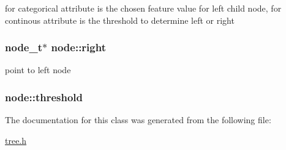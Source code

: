 for categorical attribute is the chosen feature value for left child node, for continous attribute is the threshold to determine left or right \hypertarget{classnode_a8ab67b704953f3699d566a1a5d6047ad}{
\subsubsection[{right}]{\setlength{\rightskip}{0pt plus 5cm}node\+\_\+t$\ast$ node\+::right\hspace{0.3cm}{\ttfamily [protected]}}}\label{classnode_a8ab67b704953f3699d566a1a5d6047ad}
point to left node \hypertarget{classnode_a3774a77cb58d1554f63f34cbcb737a0c}{
\subsubsection[{threshold}]{ node\+::threshold\hspace{0.3cm}{\ttfamily [protected]}}}\label{classnode_a3774a77cb58d1554f63f34cbcb737a0c}


The documentation for this class was generated from the following file\+:\begin{DoxyCompactItemize}
\item 
\hyperlink{tree_8h}{tree.\+h}\end{DoxyCompactItemize}
